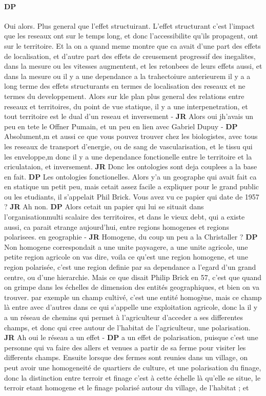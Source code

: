 \documentclass[12pt]{article}
\begin{document}
\paragraph{DP}

Oui alors. Plus general que l'effet structuirant. L'effet structurant c'est l'impact que les reseaux ont sur le temps long, et donc l'accessibilite qu'ils propagent, ont sur le territoire. Et la on a quand meme montre que ca avait d'une part des effets de localisation, et d'autre part des effets de creusement progressif des inegalites, dans la mesure ou les vitesses augmentent, et les retonbees de leurs effets aussi, et dans la mesure ou il y a une dependance a la trahectoiure anterieurem il y a a long terme des effets structurants en termes de localisation des reseaux et ne termes du developpement. Alors sur kle plan plus general des relations entre reseaux et territoires, du point de vue statique, il y a une interpenetration, et tout territoire est le dual d'un reseau et inversement - \textbf{JR} Alors oui jh'avais un peu en tete le Offner Pumain, et un peu en lien avec Gabriel Dupuy - \textbf{DP} Absolument,m et aussi ce que vous pouvez trouver chez les biologistes, avec tous les reseaux de transport d'energie, ou de sang de vascularisation, et le tissu qui les enveloppe,m donc il y a une dependance fonctionelle entre le territoire et la criculataion, et inversement. \textbf{JR} Donc les ontologies sont deja couplees a la base en fait. \textbf{DP} Les ontologies fonctionelles. Alors y'a un geographe qui avait fait ca en statique un petit peu, mais cetait assez facile a expliquer pour le grand public ou les etudiants, il s'appelait Phil Brick. Vous avez vu ce papier qui date de 1957 ? \textbf{JR} Ah non. \textbf{DP} Alors cetait un papier qui lui se situait dans l'organisationmulti scalaire des territoires, et dans le vieux debt, qui a existe aussi, ca parait etrange aujourd'hui, entre regions homogenes et regions polarisees. en geographie -  \textbf{JR} Homogene, du coup un peu a la Christaller ? \textbf{DP} Non homogene correspondait a une unite paysagere, a une unite agricole, une petite region agricole on vas dire, voila ce qu'est une region homogene, et une region polarisée, c'est une region definie par sa dependance a l'egard d'un grand centre, ou d'une hierarchie. Mais ce que disait Philip Brick en 57, c'est que quand on grimpe dans les échelles de dimension des entités geographiques, et bien on va trouver. par exemple un champ cultivé, c'est une entité homogène, mais ce champ là entre avec d'autres dans ce qui s'appelle une exploitation agricole, donc la il y a un réseau de chemins qui permet à l'agriculteur d'acceder a ses differentes champs, et donc qui cree autour de l'habitat de l'agriculteur, une polarisation. \textbf{JR} Ah oui le réseau a un effet - \textbf{DP} a un effet de polarisation, puisque c'est une personne qui va faire des allers et venues a partir de sa ferme pour visiter les differents champs. Ensuite lorsque des fermes sont reunies dans un village, on peut avoir une homogeneité de quartiers de culture, et une polarisation du finage, donc la distinction entre terroir et finage c'est à cette échelle là qu'elle se situe, le terroir etant homogene et le finage polarisé autour du village, de l'habitat ; et 
\end{document}
